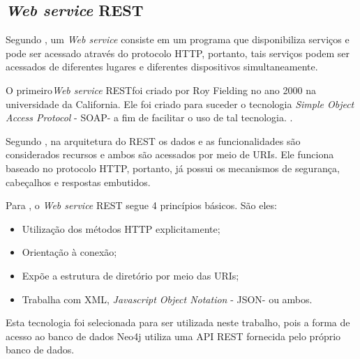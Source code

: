 \subsection{\textit{Web service} REST}

Segundo , um \textit{Web service} consiste em um programa que disponibiliza serviços e pode ser acessado através do protocolo HTTP, portanto, tais serviços podem ser acessados de diferentes lugares e diferentes dispositivos simultaneamente.

O primeiro\textit{Web service} REST\footnotemark[17] foi criado por Roy Fielding no ano 2000 na universidade da California. Ele foi criado para suceder o tecnologia \textit{Simple Object Access Protocol} - SOAP\footnotemark[18] - a fim de facilitar o uso de tal tecnologia. \cite{ibm_web_service}.



Segundo , na arquitetura do REST os dados e as funcionalidades são considerados recursos e ambos são acessados por meio de  URIs\footnotemark[19]. Ele funciona baseado no protocolo HTTP, portanto, já possui os mecanismos de segurança, cabeçalhos e respostas embutidos.


Para , o \textit{Web service} REST segue 4 princípios básicos. São eles: 

\begin{itemize}
	\item Utilização dos métodos HTTP explicitamente;
	\item Orientação à conexão;
	\item Expõe a estrutura de diretório por meio das URIs;
	\item Trabalha com XML, \textit{Javascript Object Notation} - JSON\footnotemark[20] - ou ambos.
\end{itemize}


Esta tecnologia foi selecionada para ser utilizada neste trabalho, pois a forma de acesso ao banco de dados Neo4j utiliza uma API REST fornecida pelo próprio banco de dados.
